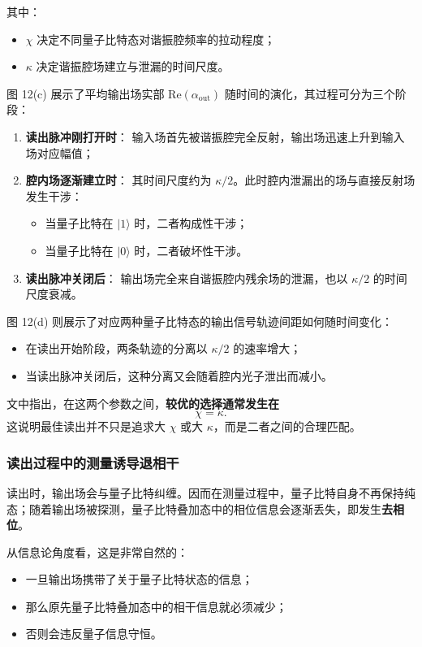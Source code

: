 \documentclass[12pt,a4paper,oneside]{ctexbook}
\begin{document}
其中：
\begin{itemize}
    \item \(\chi\) 决定不同量子比特态对谐振腔频率的拉动程度；
    \item \(\kappa\) 决定谐振腔场建立与泄漏的时间尺度。
\end{itemize}

图 12(c) 展示了平均输出场实部 \(\mathrm{Re}(\alpha_{\mathrm{out}})\) 随时间的演化，其过程可分为三个阶段：

\begin{enumerate}
    \item \textbf{读出脉冲刚打开时}：
    输入场首先被谐振腔完全反射，输出场迅速上升到输入场对应幅值；

    \item \textbf{腔内场逐渐建立时}：
    其时间尺度约为 \(\kappa/2\)。此时腔内泄漏出的场与直接反射场发生干涉：
    \begin{itemize}
        \item 当量子比特在 \(|1\rangle\) 时，二者构成性干涉；
        \item 当量子比特在 \(|0\rangle\) 时，二者破坏性干涉。
    \end{itemize}

    \item \textbf{读出脉冲关闭后}：
    输出场完全来自谐振腔内残余场的泄漏，也以 \(\kappa/2\) 的时间尺度衰减。
\end{enumerate}

图 12(d) 则展示了对应两种量子比特态的输出信号轨迹间距如何随时间变化：
\begin{itemize}
    \item 在读出开始阶段，两条轨迹的分离以 \(\kappa/2\) 的速率增大；
    \item 当读出脉冲关闭后，这种分离又会随着腔内光子泄出而减小。
\end{itemize}

文中指出，在这两个参数之间，\textbf{较优的选择通常发生在}
\[
\chi=\kappa.
\]
这说明最佳读出并不只是追求大 \(\chi\) 或大 \(\kappa\)，而是二者之间的合理匹配。

\subsubsection{读出过程中的测量诱导退相干}

读出时，输出场会与量子比特纠缠。因而在测量过程中，量子比特自身不再保持纯态；随着输出场被探测，量子比特叠加态中的相位信息会逐渐丢失，即发生\textbf{去相位}。

从信息论角度看，这是非常自然的：
\begin{itemize}
    \item 一旦输出场携带了关于量子比特状态的信息；
    \item 那么原先量子比特叠加态中的相干信息就必须减少；
    \item 否则会违反量子信息守恒。
\end{itemize}
\end{document}

